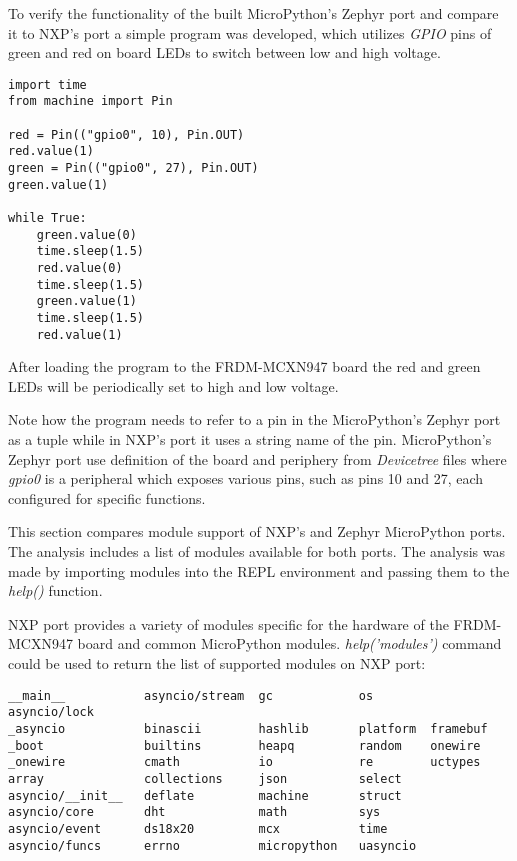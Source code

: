 \documentclass[twoside, 12pt]{article}
\begin{document}
To verify the functionality of the built MicroPython's Zephyr port and compare it to NXP's 
port a simple program was developed, which utilizes \textit{GPIO} pins of green and red on 
board LEDs to switch between low and high voltage.

\begin{lstlisting}[caption=Led program for MicroPython's Zephyr port, breaklines=true]
import time
from machine import Pin

red = Pin(("gpio0", 10), Pin.OUT)
red.value(1)
green = Pin(("gpio0", 27), Pin.OUT)
green.value(1)

while True:
    green.value(0)
    time.sleep(1.5)
    red.value(0)
    time.sleep(1.5)
    green.value(1)
    time.sleep(1.5)
    red.value(1)
\end{lstlisting}

After loading the program to the FRDM-MCXN947 board the red and green LEDs will be periodically set to high and low voltage.

Note how the program needs to refer to a pin in the MicroPython's Zephyr port as a tuple 
while in NXP's port it uses a string name of the pin. MicroPython's Zephyr port use 
definition of the board and periphery from \textit{Devicetree} files where \textit{gpio0} is 
a peripheral which exposes various pins, such as pins 10 and 27, each configured for specific 
functions.

This section compares module support of NXP's and Zephyr MicroPython ports. The analysis 
includes a list of modules available for both ports. The analysis was made by importing 
modules into the REPL environment and passing them to the \textit{help()} function.

NXP port provides a variety of modules specific for the hardware of the FRDM-MCXN947 board 
and common MicroPython modules. \textit{help('modules')} command could be used to return the 
list of supported modules on NXP port:

\begin{lstlisting}[caption=NXP's port modules, breaklines=true]
__main__           asyncio/stream  gc            os        asyncio/lock
_asyncio           binascii        hashlib       platform  framebuf
_boot              builtins        heapq         random    onewire
_onewire           cmath           io            re        uctypes
array              collections     json          select
asyncio/__init__   deflate         machine       struct
asyncio/core       dht             math          sys
asyncio/event      ds18x20         mcx           time
asyncio/funcs      errno           micropython   uasyncio
\end{lstlisting}
\end{document}

